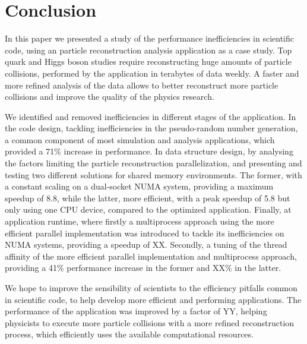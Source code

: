 \section{Conclusion}
\label{conclusion}

In this paper we presented a study of the performance inefficiencies in scientific code, using an particle reconstruction analysis application as a case study. Top quark and Higgs boson studies require reconstructing huge amounts of particle collisions, performed by the \tth application in terabytes of data weekly. A faster and more refined analysis of the data allows to better reconstruct more particle collisions and improve the quality of the physics research.

We identified and removed inefficiencies in different stages of the application. In the code design, tackling inefficiencies in the pseudo-random number generation, a common component of most simulation and analysis applications, which provided a 71\% increase in performance. In data structure design, by analysing the factors limiting the particle reconstruction parallelization, and presenting and testing two different solutions for shared memory environments. The former, with a constant scaling on a dual-socket NUMA system, providing a maximum speedup of 8.8, while the latter, more efficient, with a peak speedup of 5.8 but only using one CPU device, compared to the optimized application. Finally, at application runtime, where firstly a multiprocess approach using the more efficient parallel implementation was introduced to tackle its inefficiencies on NUMA systems, providing a speedup of XX. Secondly, a tuning of the thread affinity of the more efficient parallel implementation and multiprocess approach, providing a 41\% performance increase in the former and XX\% in the latter.

We hope to improve the sensibility of scientists to the efficiency pitfalls common in scientific code, to help develop more efficient and performing applications. The performance of the \tth application was improved by a factor of YY, helping physicists to execute more particle collisions with a more refined reconstruction process, which efficiently uses the available computational resources.

